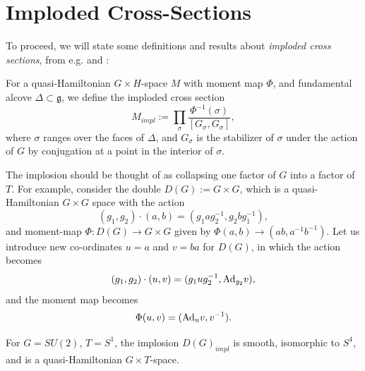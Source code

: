 	\section{Imploded Cross-Sections} 
	To proceed, we will state some definitions and results about \emph{imploded cross sections}, from e.g.\cite{alekseev_lie_1998} and \cite{jeffrey_imploded_2020}:
	\begin{definition}
		For a quasi-Hamiltonian $G\times H$-space $M$ with moment map $\Phi$, and fundamental alcove $\Delta\subset \mathfrak{g}$, we define the imploded cross section 
		\begin{equation}
			M_{impl} := \prod_{\sigma} \frac{\Phi^{-1}(\sigma)}{[G_\sigma, G_\sigma]},
		\end{equation}
		where $\sigma$ ranges over the faces of $\Delta$, and $G_\sigma$ is the stabilizer of $\sigma$ under the action of $G$ by conjugation at a point in the interior of $\sigma$.
	\end{definition}
	The implosion should be thought of as collapsing one factor of $G$ into a factor of $T$. For example, consider the double $D(G):=G\times G$, which is a quasi-Hamiltonian $G\times G$ space with the action
	\begin{equation}
		(g_1,g_2)\cdot (a,b) = (g_1 a g_2^{-1}, g_2bg_1^{-1}),
	\end{equation}
	and moment-map $\Phi:D(G)\to G\times G$ given by $\Phi(a,b)\to(ab,a^{-1}b^{-1})$. Let us introduce new co-ordinates $u=a$ and $v=ba$ for $D(G)$, in which the action becomes
	\begin{equation}
		(g_1,g_2)\cdot(u,v) = (g_1ug_2^{-1}, \text{Ad}_{g_2} v),
	\end{equation}
	and the moment map becomes
	\begin{equation}
		\Phi(u,v) = (\text{Ad}_u v, v^{-1}).
	\end{equation}
	\begin{theorem}
		For $G=SU(2)$, $T=S^1$, the implosion $D(G)_{impl}$ is smooth, isomorphic to $S^4$, and is a quasi-Hamiltonian $G\times T$-space.
	\end{theorem}
